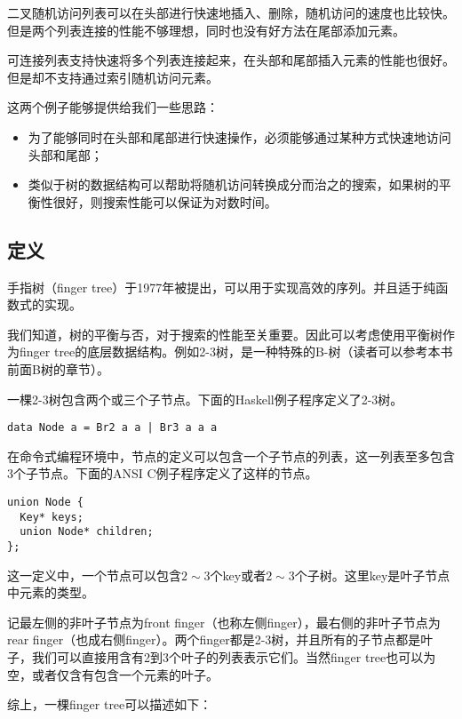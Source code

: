 \documentclass[UTF8]{article}
\begin{document}
二叉随机访问列表可以在头部进行快速地插入、删除，随机访问的速度也比较快。但是两个列表连接的性能不够理想，同时也没有好方法在尾部添加元素。

可连接列表支持快速将多个列表连接起来，在头部和尾部插入元素的性能也很好。但是却不支持通过索引随机访问元素。

这两个例子能够提供给我们一些思路：

\begin{itemize}
\item 为了能够同时在头部和尾部进行快速操作，必须能够通过某种方式快速地访问头部和尾部；
\item 类似于树的数据结构可以帮助将随机访问转换成分而治之的搜索，如果树的平衡性很好，则搜索性能可以保证为对数时间。
\end{itemize}

\subsection{定义}
手指树（finger tree）\cite{finger-tree-1977}于1977年被提出，可以用于实现高效的序列。并且适于纯函数式的实现\cite{finger-tree-2006}。

我们知道，树的平衡与否，对于搜索的性能至关重要。因此可以考虑使用平衡树作为finger tree的底层数据结构。例如2-3树，是一种特殊的B-树（读者可以参考本书前面B树的章节）。

一棵2-3树包含两个或三个子节点。下面的Haskell例子程序定义了2-3树。

\lstset{language=Haskell}
\begin{lstlisting}
data Node a = Br2 a a | Br3 a a a
\end{lstlisting}

在命令式编程环境中，节点的定义可以包含一个子节点的列表，这一列表至多包含3个子节点。下面的ANSI C例子程序定义了这样的节点。

\lstset{language=C}
\begin{lstlisting}
union Node {
  Key* keys;
  union Node* children;
};
\end{lstlisting}

这一定义中，一个节点可以包含$2 \sim 3$个key或者$2 \sim 3$个子树。这里key是叶子节点中元素的类型。

记最左侧的非叶子节点为front finger（也称左侧finger），最右侧的非叶子节点为rear finger（也成右侧finger）。两个finger都是2-3树，并且所有的子节点都是叶子，我们可以直接用含有2到3个叶子的列表表示它们。当然finger tree也可以为空，或者仅含有包含一个元素的叶子。

综上，一棵finger tree可以描述如下：
\end{document}
